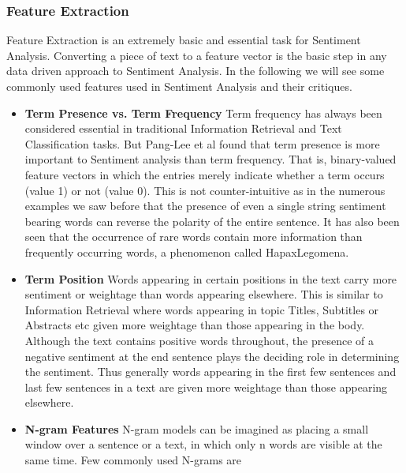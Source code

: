 \documentclass[journal]{IEEEtran}
\begin{document}
\subsubsection{Feature Extraction}
Feature Extraction is an extremely basic and essential task for Sentiment Analysis. Converting a piece of text to a feature vector is the basic step in any data driven approach to Sentiment Analysis\cite{nlp3}. In the following we will see some commonly used features used in Sentiment Analysis and their critiques.
\begin{itemize}
	\item \textbf{Term Presence vs. Term Frequency} Term frequency has always been considered essential in traditional Information Retrieval and Text Classification tasks. But Pang-Lee et al found that term presence is more important to Sentiment analysis than term frequency. That is, binary-valued feature vectors in which the entries merely indicate whether a term occurs (value 1) or not (value 0). This is not counter-intuitive as in the numerous examples we saw before that the presence of even a single string sentiment bearing words can reverse the polarity of the entire sentence. It has also been seen that the occurrence of rare words contain 
	more information than frequently occurring words, a phenomenon called HapaxLegomena.
	\item\textbf{Term Position} Words appearing in certain positions in the text carry more sentiment or weightage than words appearing elsewhere. This is similar to Information Retrieval where words appearing in topic Titles, Subtitles or Abstracts etc given more weightage than those appearing in the body. Although the text contains positive words throughout, the presence of 
	a negative sentiment at the end sentence plays the deciding role in determining the sentiment. Thus generally words appearing in the first few sentences and last few sentences in a text are given more weightage than those appearing elsewhere.
	\item\textbf{N-gram Features} N-gram models can be imagined as placing a small window over a sentence or a text, in which only n words are visible at the same time. Few commonly used N-grams are 
	

\end{itemize}
\end{document}
